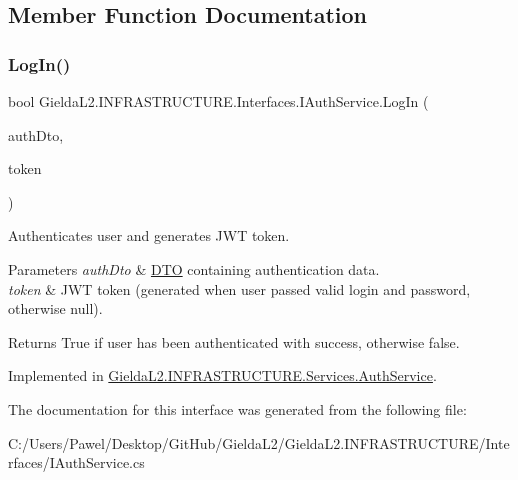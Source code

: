 \subsection{Member Function Documentation}
\mbox{\label{interface_gielda_l2_1_1_i_n_f_r_a_s_t_r_u_c_t_u_r_e_1_1_interfaces_1_1_i_auth_service_a9228c59864a95e038b513ee771f398bb}} 
\subsubsection{\texorpdfstring{LogIn()}{LogIn()}}
{\footnotesize\ttfamily bool Gielda\+L2.\+I\+N\+F\+R\+A\+S\+T\+R\+U\+C\+T\+U\+R\+E.\+Interfaces.\+I\+Auth\+Service.\+Log\+In (\begin{DoxyParamCaption}\item[{\mbox{\hyperlink{class_gielda_l2_1_1_i_n_f_r_a_s_t_r_u_c_t_u_r_e_1_1_d_t_o_1_1_auth_d_t_o}{Auth\+D\+TO}}}]{auth\+Dto,  }\item[{out string}]{token }\end{DoxyParamCaption})}



Authenticates user and generates J\+WT token. 


\begin{DoxyParams}{Parameters}
{\em auth\+Dto} & \mbox{\hyperlink{namespace_gielda_l2_1_1_i_n_f_r_a_s_t_r_u_c_t_u_r_e_1_1_d_t_o}{D\+TO}} containing authentication data.\\
\hline
{\em token} & J\+WT token (generated when user passed valid login and password, otherwise null).\\
\hline
\end{DoxyParams}
\begin{DoxyReturn}{Returns}
True if user has been authenticated with success, otherwise false.
\end{DoxyReturn}


Implemented in \mbox{\hyperlink{class_gielda_l2_1_1_i_n_f_r_a_s_t_r_u_c_t_u_r_e_1_1_services_1_1_auth_service_a11f0907fef09930d6533a6f6287d49ba}{Gielda\+L2.\+I\+N\+F\+R\+A\+S\+T\+R\+U\+C\+T\+U\+R\+E.\+Services.\+Auth\+Service}}.



The documentation for this interface was generated from the following file\+:\begin{DoxyCompactItemize}
\item 
C\+:/\+Users/\+Pawel/\+Desktop/\+Git\+Hub/\+Gielda\+L2/\+Gielda\+L2.\+I\+N\+F\+R\+A\+S\+T\+R\+U\+C\+T\+U\+R\+E/\+Interfaces/I\+Auth\+Service.\+cs\end{DoxyCompactItemize}
